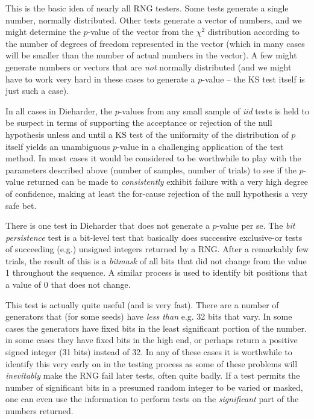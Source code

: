 \documentclass{book}
\begin{document}
This is the basic idea of nearly all RNG testers.  Some tests generate a
single number, normally distributed.  Other tests generate a vector of
numbers, and we might determine the $p$-value of the vector from the
$\chi^2$ distribution according to the number of degrees of freedom
represented in the vector (which in many cases will be smaller than the
number of actual numbers in the vector).  A few might generate numbers
or vectors that are {\em not} normally distributed (and we might have to
work very hard in these cases to generate a $p$-value -- the KS test
itself is just such a case).

In all cases in Dieharder, the $p$-values from any small sample of {\em
iid} tests is held to be suspect in terms of supporting the acceptance
or rejection of the null hypothesis unless and until a KS test of the
uniformity of the distribution of $p$ itself yields an unambiguous
$p$-value in a challenging application of the test method.  In most
cases it would be considered to be worthwhile to play with the
parameters described above (number of samples, number of trials) to see
if the $p$-value returned can be made to {\em consistently} exhibit
failure with a very high degree of confidence, making at least the
for-cause rejection of the null hypothesis a very safe bet.

There is one test in Dieharder that does not generate a $p$-value per
se.  The {\em bit persistence} test is a bit-level test that basically
does successive exclusive-or tests of succeeding (e.g.) unsigned
integers returned by a RNG.  After a remarkably few trials, the result
of this is a {\em bitmask} of all bits that did not change from the
value 1 throughout the sequence.  A similar process is used to identify
bit positions that a value of 0 that does not change. 

This test is actually quite useful (and is very fast).  There are a
number of generators that (for some seeds) have {\em less than} e.g. 32
bits that vary.  In some cases the generators have fixed bits in the
least significant portion of the number. in some cases they have fixed
bits in the high end, or perhaps return a positive signed integer (31
bits) instead of 32.  In any of these cases it is worthwhile to identify
this very early on in the testing process as some of these problems will
{\em inevitably} make the RNG fail later tests, often quite badly.  If a
test permits the number of significant bits in a presumed random integer
to be varied or masked, one can even use the information to perform
tests on the {\em significant} part of the numbers returned.
\end{document}
